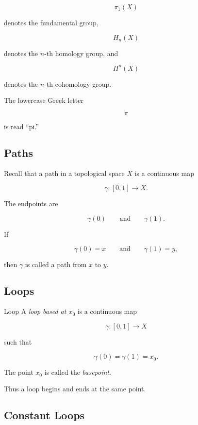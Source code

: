 \[
\pi_1(X)
\]

denotes the fundamental group,

\[
H_n(X)
\]

denotes the \(n\)-th homology group, and

\[
H^n(X)
\]

denotes the \(n\)-th cohomology group.

The lowercase Greek letter

\[
\pi
\]

is read ``pi.''

\subsection{Paths}
\label{subsec:algebraic-topology-paths}

Recall that a path in a topological space \(X\) is a continuous map

\[
\boxed{
\gamma:[0,1]\to X.
}
\]

The endpoints are

\[
\gamma(0)
\qquad\text{and}\qquad
\gamma(1).
\]

If

\[
\gamma(0)=x
\qquad\text{and}\qquad
\gamma(1)=y,
\]

then \(\gamma\) is called a path from \(x\) to \(y\).

\subsection{Loops}
\label{subsec:loops}

\begin{definitionbox}{Loop}
A \emph{loop based at \(x_0\)} is a continuous map

\[
\boxed{
\gamma:[0,1]\to X
}
\]

such that

\[
\boxed{
\gamma(0)=\gamma(1)=x_0.
}
\]
\end{definitionbox}

The point \(x_0\) is called the \emph{basepoint}.

Thus a loop begins and ends at the same point.

\subsection{Constant Loops}
\label{subsec:constant-loops}

